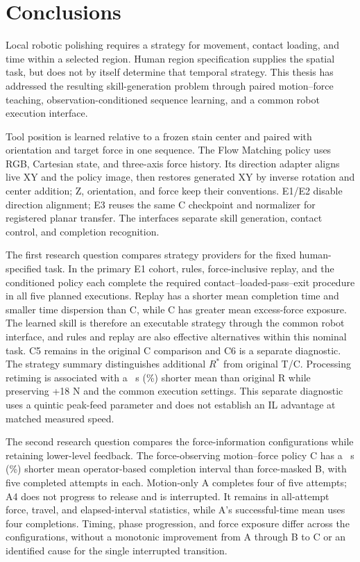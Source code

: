 \chapter{Conclusions}
\label{chap:conclusions}

Local robotic polishing requires a strategy for movement, contact loading, and time within a selected region. Human region specification supplies the spatial task, but does not by itself determine that temporal strategy. This thesis has addressed the resulting skill-generation problem through paired motion--force teaching, observation-conditioned sequence learning, and a common robot execution interface.

Tool position is learned relative to a frozen stain center and paired with orientation and target force in one sequence. The Flow Matching policy uses RGB, Cartesian state, and three-axis force history. Its direction adapter aligns live XY and the policy image, then restores generated XY by inverse rotation and center addition; Z, orientation, and force keep their conventions. E1/E2 disable direction alignment; E3 reuses the same C checkpoint and normalizer for registered planar transfer. The interfaces separate skill generation, contact control, and completion recognition.

The first research question compares strategy providers for the fixed human-specified task. In the primary E1 cohort, rules, force-inclusive replay, and the conditioned policy each complete the required contact--loaded-pass--exit procedure in all five planned executions. Replay has a shorter mean completion time and smaller time dispersion than C, while C has greater mean excess-force exposure. The learned skill is therefore an executable strategy through the common robot interface, and rules and replay are also effective alternatives within this nominal task. C5 remains in the original C comparison and C6 is a separate diagnostic. The strategy summary distinguishes additional \(R^{*}\) from original T/C. Processing retiming is associated with a \RstarTimeGain~s (\RstarTimePercent\%) shorter mean than original R while preserving +18 N and the common execution settings. This separate diagnostic uses a quintic peak-feed parameter and does not establish an IL advantage at matched measured speed.

The second research question compares the force-information configurations while retaining lower-level feedback. The force-observing motion--force policy C has a \BCSeconds~s (\BCPercent\%) shorter mean operator-based completion interval than force-masked B, with five completed attempts in each. Motion-only A completes four of five attempts; A4 does not progress to release and is interrupted. It remains in all-attempt force, travel, and elapsed-interval statistics, while A's successful-time mean uses four completions. Timing, phase progression, and force exposure differ across the configurations, without a monotonic improvement from A through B to C or an identified cause for the single interrupted transition.

